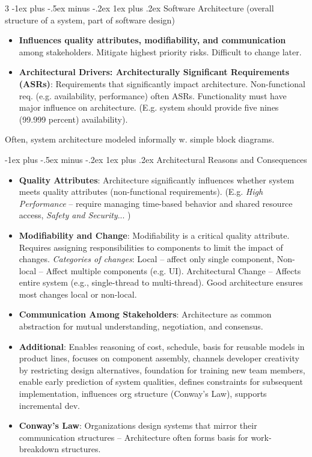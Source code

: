 \documentclass[a4paper, 10pt, landscape]{article}
\makeatletter
\renewcommand{\subsubsection}{\@startsection{subsubsection}{3}{0mm}%
                                {-1ex plus -.5ex minus -.2ex}%
                                {1ex plus .2ex}%
                                {\normalfont\small\bfseries}}
\makeatother
\begin{document}
\begin{multicols*}{3}
\subsubsection{Software Architecture  {\scriptsize (overall structure of a system, part of software design)}}
\begin{itemize}
	\item \textbf{Influences quality attributes, modifiability, and communication} among stakeholders. Mitigate highest priority risks. Difficult to change later.
      \item \textbf{Architectural Drivers: Architecturally Significant Requirements (ASRs)}: Requirements that significantly impact architecture. Non-functional req. (e.g. availability, performance) often ASRs. Functionality must have major influence on architecture. (E.g. system should provide five nines (99.999 percent) availability). 
\end{itemize}
Often, system architecture modeled informally w. simple block diagrams.

\subsubsection{Architectural Reasons and Consequences}
\begin{itemize}
    \item \textbf{Quality Attributes}: Architecture significantly influences whether system meets quality attributes (non-functional requirements). (E.g. \textit{High Performance} -- require managing time-based behavior and shared resource access, \textit{Safety and Security}... )
    \item \textbf{Modifiability and Change}: Modifiability is a critical quality attribute. Requires assigning responsibilities to components to limit the impact of changes.
    \textit{Categories of changes}: Local -- affect only single component, Non-local -- Affect multiple components (e.g. UI). Architectural Change -- Affects entire system (e.g., single-thread to multi-thread). Good architecture ensures most changes local or non-local.
    \item \textbf{Communication Among Stakeholders}: Architecture as common abstraction for mutual understanding, negotiation, and consensus.
    \item \textbf{Additional}: Enables reasoning of cost, schedule, basis for reusable models in product lines, focuses on component assembly, channels developer creativity by restricting design alternatives, foundation for training new team members, enable early prediction of system qualities, defines constraints for subsequent implementation, influences org structure (Conway’s Law), supports incremental dev.
    \item \textbf{Conway’s Law}: Organizations design systems that mirror their communication structures -- Architecture often forms basis for work-breakdown structures.
\end{itemize}


\end{multicols*}
\end{document}
